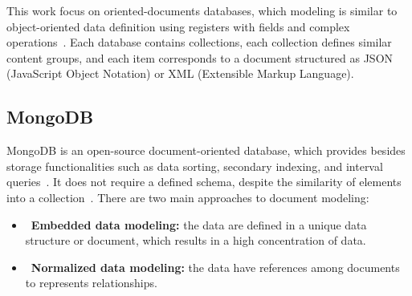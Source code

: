 \documentclass{svproc}
\begin{document}
This work focus on oriented-documents databases, which modeling is similar to object-oriented data definition using registers with fields and complex operations~\cite{patil:2017}. 
Each database contains collections, each collection defines similar content groups, and each item corresponds to a document structured as JSON (JavaScript Object Notation) or XML (Extensible Markup Language).

\subsection{MongoDB}



MongoDB is an open-source document-oriented database, which provides besides storage functionalities such as data sorting, secondary indexing, and interval queries~\cite{membrey2011definitive}.
It does not require a defined schema, despite the similarity of elements into a collection~\cite{kanade2014study,lutu2015big}. There are two main approaches to document modeling:


\begin{itemize}
\item~\textbf{Embedded data modeling:} the data are defined in a unique data structure or document, which results in a high concentration of data.
\item~\textbf{Normalized data modeling:} the data have references among documents to represents relationships.     
\end{itemize}
\end{document}
